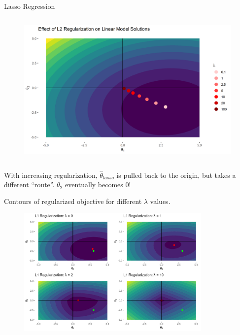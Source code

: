 \documentclass[11pt,compress,t,notes=noshow, xcolor=table]{beamer}
\begin{document}
\begin{vbframe}{Lasso Regression}
\begin{columns}
\begin{column}{0.5\textwidth}
\lz
\begin{figure}
\includegraphics[width=0.99\textwidth]{figure/lin_model_regu_02.png}
\end{figure}
\end{column}
\end{columns}



\lz

With increasing regularization, $\hat{\theta}_{\textit{lasso}}$ is pulled back to the origin, but takes a different ``route''. $\theta_2$ eventually becomes 0!


\framebreak 

Contours of regularized objective for different $\lambda$ values.
\begin{figure}
\includegraphics[width=0.85\textwidth]{figure/reg_contours_01.png}
\end{figure}


\end{vbframe}
\end{document}
